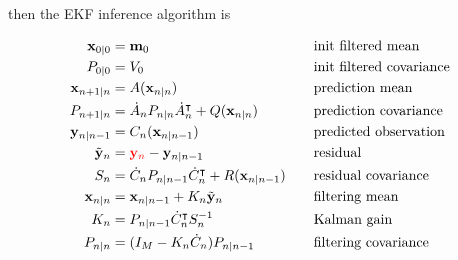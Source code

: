 \documentclass[12pt]{article}
\begin{document}
\noindent then the EKF inference algorithm is

\begin{alignat*}{2}
    \mathbf{x}_{0|0}&=\mathbf{m}_0&&\text{init filtered mean}\\
    P_{0|0}&=V_0&&\text{init filtered covariance}\\
    \mathbf{x}_{n+1|n}&=A(\mathbf{x}_{n|n})\quad&&\text{prediction mean}\\
    P_{n+1|n}&=\dot{A}_nP_{n|n}\dot{A}_n^\intercal+Q(\mathbf{x}_{n|n})\quad&&\text{prediction covariance}\\
    \mathbf{y}_{n|n-1}&=C_n(\mathbf{x}_{n|n-1})\quad&&\text{predicted observation}\\
    \tilde{\mathbf{y}}_n&=\textcolor{red}{\mathbf{y}_n}-\mathbf{y}_{n|n-1}\quad&&\text{residual}\\
    S_n&=\dot{C}_nP_{n|n-1}\dot{C}_n^\intercal+R(\mathbf{x}_{n|n-1})\quad&&\text{residual covariance}\\
    \mathbf{x}_{n|n}&=\mathbf{x}_{n|n-1}+K_n\tilde{\mathbf{y}}_n\quad&&\text{filtering mean}\\
    K_n&=P_{n|n-1}\dot{C}_n^\intercal S_n^{-1}&&\text{Kalman gain}\\
    P_{n|n}&=(I_M-K_n\dot{C}_n)P_{n|n-1}&&\text{filtering covariance}
\end{alignat*}



\end{document}
